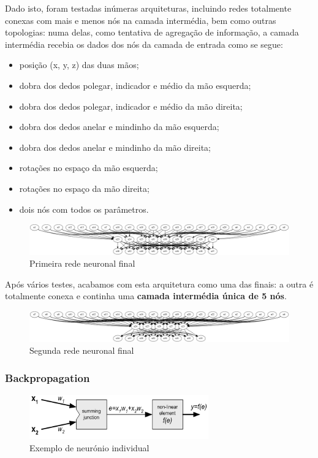 \documentclass[10pt,a4paper]{article}
\begin{document}
Dado isto, foram testadas inúmeras arquiteturas, incluindo redes totalmente conexas com mais e menos nós na camada intermédia, bem como outras topologias: numa delas, como tentativa de agregação de informação, a camada intermédia recebia os dados dos nós da camada de entrada como se segue:
\begin{itemize}
\item posição (x, y, z) das duas mãos;
\item dobra dos dedos polegar, indicador e médio da mão esquerda;
\item dobra dos dedos polegar, indicador e médio da mão direita;
\item dobra dos dedos anelar e mindinho da mão esquerda;
\item dobra dos dedos anelar e mindinho da mão direita;
\item rotações no espaço da mão esquerda;
\item rotações no espaço da mão direita;
\item dois nós com todos os parâmetros.
\end{itemize}

\begin{figure}[here]
\centering
\includegraphics[scale=0.15]{net2.png}
\caption{Primeira rede neuronal final}
\end{figure}

Após vários testes, acabamos com esta arquitetura como uma das finais: a outra é totalmente conexa e continha uma \textbf{camada intermédia única de 5 nós}.
\\
\begin{figure}[here]
\centering
\includegraphics[scale=0.15]{net1.png}
\caption{Segunda rede neuronal final}
\end{figure}

\subsubsection{Backpropagation}

\begin{figure}[here]
\centering
\includegraphics{neuron.png}
\caption{Exemplo de neurónio individual}
\end{figure}
\end{document}
